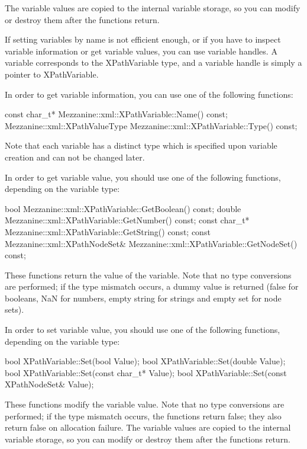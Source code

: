 The variable values are copied to the internal variable storage, so you can modify or destroy them after the functions return. \par
 \par
 If setting variables by name is not efficient enough, or if you have to inspect variable information or get variable values, you can use variable handles. A variable corresponds to the XPathVariable type, and a variable handle is simply a pointer to XPathVariable. \par
 \par
 In order to get variable information, you can use one of the following functions: 
\begin{DoxyCode}
 const char_t* Mezzanine::xml::XPathVariable::Name() const;
 Mezzanine::xml::XPathValueType Mezzanine::xml::XPathVariable::Type() const;
\end{DoxyCode}
 Note that each variable has a distinct type which is specified upon variable creation and can not be changed later. \par
 \par
 In order to get variable value, you should use one of the following functions, depending on the variable type: 
\begin{DoxyCode}
 bool Mezzanine::xml::XPathVariable::GetBoolean() const;
 double Mezzanine::xml::XPathVariable::GetNumber() const;
 const char_t* Mezzanine::xml::XPathVariable::GetString() const;
 const Mezzanine::xml::XPathNodeSet& Mezzanine::xml::XPathVariable::GetNodeSet() 
      const;
\end{DoxyCode}
 These functions return the value of the variable. Note that no type conversions are performed; if the type mismatch occurs, a dummy value is returned (false for booleans, NaN for numbers, empty string for strings and empty set for node sets). \par
 \par
 In order to set variable value, you should use one of the following functions, depending on the variable type: 
\begin{DoxyCode}
 bool XPathVariable::Set(bool Value);
 bool XPathVariable::Set(double Value);
 bool XPathVariable::Set(const char_t* Value);
 bool XPathVariable::Set(const XPathNodeSet& Value);
\end{DoxyCode}
 These functions modify the variable value. Note that no type conversions are performed; if the type mismatch occurs, the functions return false; they also return false on allocation failure. The variable values are copied to the internal variable storage, so you can modify or destroy them after the functions return. \par
